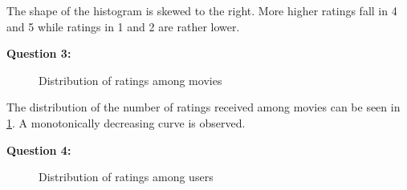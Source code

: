 \documentclass{article}
\begin{document}
The shape of the histogram is skewed to the right. More higher ratings fall in 4 and 5 while ratings in 1 and 2 are rather lower.
\newline

\bigbreak \textbf{Question 3:}

\begin{figure}
\centering
{}
\caption{Distribution of ratings among movies} \label{Q3}
\end{figure}

The distribution of the number of ratings received among movies can be seen in \ref{Q3}. A monotonically decreasing curve is observed.
\newline

\bigbreak \textbf{Question 4:}

\begin{figure}
\centering
{}
\caption{Distribution of ratings among users} \label{Q4}
\end{figure}
\end{document}
